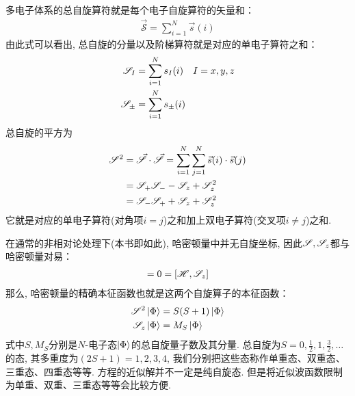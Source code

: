 多电子体系的总自旋算符就是每个电子自旋算符的矢量和：
\begin{align}
\vec{\mathscr{S}} = \sum_{i=1}^{N}\vec{s}(i)
\end{align}
由此式可以看出, 总自旋的分量以及阶梯算符就是对应的单电子算符之和：
\begin{subequations}
	\begin{align}
	\mathscr{S}_I   & = \sum_{i=1}^{N}s_I(i)\quad I=x,y,z\\
	\mathscr{S}_\pm & = \sum_{i=1}^{N}s_\pm(i) 
	\end{align}
\end{subequations}
总自旋的平方为
\begin{align}
\mathscr{S}^2 & = \vec{\mathscr{S}}\cdot\vec{\mathscr{S}} = \sum_{i=1}^{N}\sum_{j=1}^{N} \vec{s}(i)\cdot\vec{s}(j) \notag \\
      & = \mathscr{S}_+\mathscr{S}_- - \mathscr{S}_z + \mathscr{S}^2_z\notag\\
      & = \mathscr{S}_-\mathscr{S}_+ + \mathscr{S}_z + \mathscr{S}^2_z
\end{align}
它就是对应的单电子算符(对角项$i=j$)之和加上双电子算符(交叉项$i\neq j$)之和.

在通常的非相对论处理下(本书即如此), 哈密顿量中并无自旋坐标, 因此$\mathscr{S},\mathscr{S}_z$都与哈密顿量对易：
\begin{align}
[\hs \ts^2] = 0 = [\hs,\ts_z]
\end{align} 
那么, 哈密顿量的精确本征函数也就是这两个自旋算子的本征函数：
\begin{subequations}
	\begin{align}
	\mathscr{S}^2\Ket{\Phi} & = S(S+1)\Ket{\Phi}\\
	\mathscr{S}_z\Ket{\Phi} & = M_S\Ket{\Phi}
	\end{align}
\end{subequations}
式中$S,M_S$分别是$N$-电子态$\Ket{\Phi}$的总自旋量子数及其分量. 总自旋为$S=0,\frac{1}{2},1,\frac{3}{2},\ldots$的态, 其多重度为$(2S+1)=1,2,3,4$, 我们分别把这些态称作单重态、双重态、三重态、四重态等等. \sch 方程的近似解并不一定是纯自旋态. 但是将近似波函数限制为单重、双重、三重态等等会比较方便.

